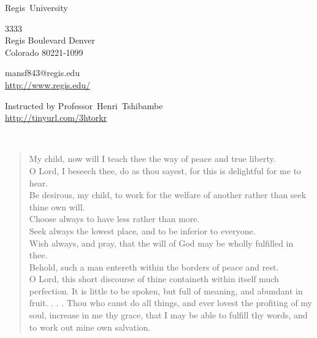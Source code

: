\documentclass[11pt,a4paper]{scrartcl} %
\begin{document}
\pagecolor{Gray!20!Bittersweet!10}
\begin{cv}{}
        \begin{cvlist}{\textcolor{brown}{}}\label{PersDat}  
            \item   Regis~University
            \item   3333\\
                    Regis Boulevard Denver \\	
                    Colorado 80221-1099
            \item   mansf843@regis.edu\\				
                    \url{http://www.regis.edu/}				
        \end{cvlist}
        \begin{cvlist}{}\label{irgendwas}
            \item Instructed by Professor~Henri~Tshibambe\\
             \url{http://tinyurl.com/3htorkr}
        \end{cvlist}
    \end{cv}
\clearpage

\noindent
\textcolor{Maroon}{}\\
\textcolor{brown}{}
\begin{verse}
My child, now will I teach thee the way of peace and true liberty.\\
O Lord, I beseech thee, do as thou sayest, for this is delightful for me to hear.\\
Be desirous, my child, to work for the welfare of another rather than seek thine own will.\\
Choose always to have less rather than more.\\
Seek always the lowest place, and to be inferior to everyone.\\
Wish always, and pray, that the will of God may be wholly fulfilled in thee.\\
Behold, such a man entereth within the borders of peace and rest.\\
O Lord, this short discourse of thine containeth within itself much perfection. It is little to be spoken, but full of meaning, and abundant in fruit. . . . Thou who canst do all things, and ever lovest the profiting of my soul, increase in me thy grace, that I may be able to fulfill thy words, and to work out mine own salvation.
\end{verse}
\textcolor{brown}{\citealp[pg. 199]{eknath}}
\clearpage
\title{\textcolor{Maroon}{\rmfamily\normalfont{}}}
    \author{\textcolor{brown}{}}
    \date{} %
    
\end{document}

